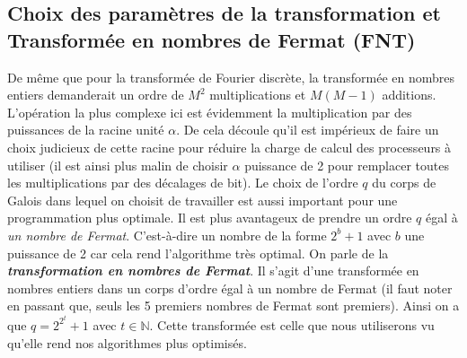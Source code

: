 \subsection{Choix des paramètres de la transformation et Transformée en nombres de Fermat (FNT)}\label{NbrFermat}
De même que pour la transformée de Fourier discrète, la transformée en nombres entiers demanderait un ordre de $ M^{2} $ multiplications et $ M(M-1) $ additions. L'opération la plus complexe ici est évidemment la multiplication par des puissances de la racine unité $ \alpha $. De cela découle qu'il est impérieux de faire un choix judicieux de cette racine pour réduire la charge de calcul des processeurs à utiliser (il est ainsi plus malin de choisir $ \alpha $ puissance de 2 pour remplacer toutes les multiplications par des décalages de bit). Le choix de l'ordre $ q $ du corps de Galois dans lequel on choisit de travailler est aussi important pour une programmation plus optimale. Il est plus avantageux de prendre un ordre $ q $ égal à \emph{un nombre de Fermat}. C'est-à-dire un nombre de la forme $ 2^{b} + 1 $ avec $ b $ une puissance de 2 car cela rend l'algorithme très optimal. On parle de la \textbf{\emph{transformation en nombres de Fermat}}.
Il s'agit d'une transformée en nombres entiers dans un corps d'ordre égal à un nombre de Fermat (il faut noter en passant que, seuls les 5 premiers nombres de Fermat sont premiers). Ainsi on a que $ q = 2^{2^{t}} + 1 $ avec $ t\in\mathbb{N} $. Cette transformée est celle que nous utiliserons vu qu'elle rend nos algorithmes plus optimisés.
